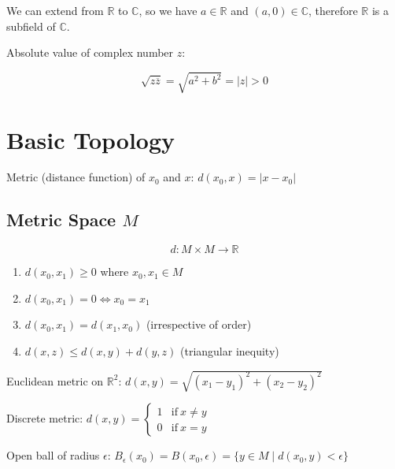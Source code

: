 \documentclass{article}
\begin{document}
    We can extend from $\mathbb{R}$ to $\mathbb{C}$, so we have $a \in \mathbb{R}$ and $(a, 0) \in \mathbb{C}$, therefore $\mathbb{R}$ is a subfield of $\mathbb{C}$.
    
    Absolute value of complex number $z$:
    
    \begin{displaymath}
        \sqrt{z \overline{z}} = \sqrt{a^{2} + b^{2}} = \left| z \right| > 0
    \end{displaymath}
    
    \section{Basic Topology}

        Metric (distance function) of $x_{0}$ and $x$: $d(x_{0}, x) = \lvert x - x_{0} \rvert$

    \subsection{Metric Space $M$}

        \begin{displaymath}
        d \colon M \times M \to \mathbb{R}
        \end{displaymath}

        \begin{enumerate}
            \item $d(x_{0}, x_{1}) \geq 0$ where $x_{0}, x_{1} \in M$
            \item $d(x_{0}, x_{1}) = 0 \iff x_{0} = x_{1}$
            \item $d(x_{0}, x_{1}) = d(x_{1}, x_{0})$ (irrespective of order)
            \item $d(x, z) \leq d(x, y) + d(y, z)$ (triangular inequity)
        \end{enumerate}

        Euclidean metric on $\mathbb{R}^{2}$:
        $d(x, y) = \sqrt{(x_{1} - y_{1})^{2} + (x_{2} - y_{2})^{2}}$

        Discrete metric: $d(x, y) = \left\{\begin{matrix}
        1 &\mbox{if}\ x \neq y \\
        0 &\mbox{if}\ x = y 
        \end{matrix}\right.$

        Open ball of radius $\epsilon$:
        $B_{\epsilon}(x_{0}) = B(x_{0}, \epsilon) = \{ y \in M \mid d(x_{0}, y) < \epsilon \}$
\end{document}
